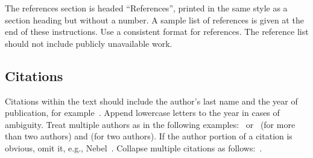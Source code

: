 \documentclass{article}
\begin{document}
The references section is headed ``References'', printed in the same
style as a section heading but without a number. A sample list of
references is given at the end of these instructions. Use a consistent
format for references. The reference list should not include publicly unavailable work.

\subsection{Citations}

Citations within the text should include the author's last name and
the year of publication, for example~\cite{gottlob:nonmon}.  Append
lowercase letters to the year in cases of ambiguity.  Treat multiple
authors as in the following examples:~\cite{abelson-et-al:scheme}
or~\cite{bgf:Lixto} (for more than two authors) and
\cite{brachman-schmolze:kl-one} (for two authors).  If the author
portion of a citation is obvious, omit it, e.g.,
Nebel~.  Collapse multiple citations as
follows:~\cite{gls:hypertrees,levesque:functional-foundations}.
\nocite{abelson-et-al:scheme}
\nocite{bgf:Lixto}
\nocite{brachman-schmolze:kl-one}
\nocite{gottlob:nonmon}
\nocite{gls:hypertrees}
\nocite{levesque:functional-foundations}
\nocite{levesque:belief}
\nocite{nebel:jair-2000}






\end{document}
